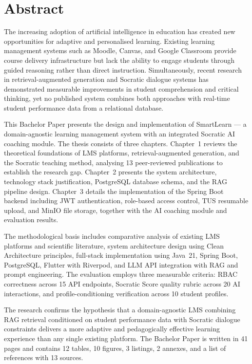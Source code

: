 \documentclass[12pt,a4paper]{report}
\begin{document}
\chapter*{Abstract}

The increasing adoption of artificial intelligence in education has created new
opportunities for adaptive and personalised learning. Existing learning management
systems such as Moodle, Canvas, and Google Classroom provide course delivery
infrastructure but lack the ability to engage students through guided reasoning
rather than direct instruction. Simultaneously, recent research in
retrieval-augmented generation and Socratic dialogue systems has demonstrated
measurable improvements in student comprehension and critical thinking, yet no
published system combines both approaches with real-time student performance data
from a relational database.

This Bachelor Paper presents the design and implementation of SmartLearn --- a
domain-agnostic learning management system with an integrated Socratic AI coaching
module. The thesis consists of three chapters. Chapter~1 reviews the theoretical
foundations of LMS platforms, retrieval-augmented generation, and the Socratic
teaching method, analysing 13 peer-reviewed publications to establish the research
gap. Chapter~2 presents the system architecture, technology stack justification,
PostgreSQL database schema, and the RAG pipeline design. Chapter~3 details the
implementation of the Spring Boot backend including JWT authentication, role-based
access control, TUS resumable upload, and MinIO file storage, together with the AI
coaching module and evaluation results.

The methodological basis includes comparative analysis of existing LMS platforms
and scientific literature, system architecture design using Clean Architecture
principles, full-stack implementation using Java~21, Spring Boot, PostgreSQL,
Flutter with Riverpod, and LLM API integration with RAG and prompt engineering. The
evaluation employs three measurable criteria: RBAC correctness across 15 API
endpoints, Socratic Score quality rubric across 20 AI interactions, and
profile-conditioning verification across 10 student profiles.

The research confirms the hypothesis that a domain-agnostic LMS combining RAG
retrieval conditioned on student performance data with Socratic dialogue constraints
delivers a more adaptive and pedagogically effective learning experience than any
single existing platform. The Bachelor Paper is written in 41 pages and contains 12
tables, 10 figures, 3 listings, 2 annexes, and a list of references with 13 sources.
\end{document}
